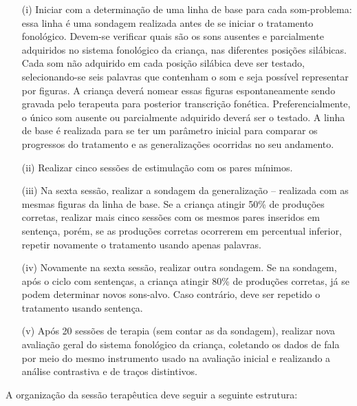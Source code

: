 \documentclass[output=paper,colorlinks,citecolor=brown,booklanguage=portuguese]{langscibook}
\begin{document}
\begin{itemize}
\item [(i)] Iniciar com a determinação de uma linha de base para cada som-problema: essa linha é uma sondagem realizada antes de se iniciar o tratamento fonológico. Devem-se verificar quais são os sons ausentes e parcialmente adquiridos no sistema fonológico da criança, nas diferentes posições silábicas. Cada som não adquirido em cada posição silábica deve ser testado, selecionando-se seis palavras que contenham o som e seja possível representar por figuras. A criança deverá nomear essas figuras espontaneamente sendo gravada pelo terapeuta para posterior transcrição fonética. Preferencialmente, o único som ausente ou parcialmente adquirido deverá ser o testado. A linha de base é realizada para se ter um parâmetro inicial para comparar os progressos do tratamento e as generalizações ocorridas no seu andamento.
\item [(ii)] Realizar cinco sessões de estimulação com os pares mínimos.
\item [(iii)] Na sexta sessão, realizar a sondagem da generalização -- realizada com as mesmas figuras da linha de base. Se a criança atingir 50\% de produções corretas, realizar mais cinco sessões com os mesmos pares inseridos em sentença, porém, se as produções corretas ocorrerem em percentual inferior, repetir novamente o tratamento usando apenas palavras.
\item [(iv)] Novamente na sexta sessão, realizar outra sondagem. Se na sondagem, após o ciclo com sentenças, a criança atingir 80\% de produções corretas, já se podem determinar novos sons-alvo. Caso contrário, deve ser repetido o tratamento usando sentença. 
\item [(v)] Após 20 sessões de terapia (sem contar as da sondagem), realizar nova avaliação geral do sistema fonológico da criança, coletando os dados de fala por meio do mesmo instrumento usado na avaliação inicial e realizando a análise contrastiva e de traços distintivos.
\end{itemize}

A organização da sessão terapêutica deve seguir a seguinte estrutura: 
\end{document}
